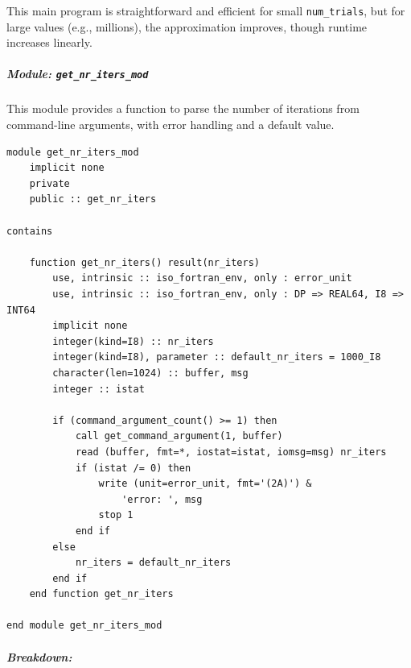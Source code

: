 This main program is straightforward and efficient for small \texttt{num\_trials}, but for large values (e.g., millions), the approximation improves, though runtime increases linearly.

\subparagraph{Module: \texttt{get\_nr\_iters\_mod}}

This module provides a function to parse the number of iterations from command-line arguments, with error handling and a default value.

\begin{verbatim}
module get_nr_iters_mod
    implicit none
    private
    public :: get_nr_iters

contains

    function get_nr_iters() result(nr_iters)
        use, intrinsic :: iso_fortran_env, only : error_unit
        use, intrinsic :: iso_fortran_env, only : DP => REAL64, I8 => INT64
        implicit none
        integer(kind=I8) :: nr_iters
        integer(kind=I8), parameter :: default_nr_iters = 1000_I8
        character(len=1024) :: buffer, msg
        integer :: istat

        if (command_argument_count() >= 1) then
            call get_command_argument(1, buffer)
            read (buffer, fmt=*, iostat=istat, iomsg=msg) nr_iters
            if (istat /= 0) then
                write (unit=error_unit, fmt='(2A)') &
                    'error: ', msg
                stop 1
            end if
        else
            nr_iters = default_nr_iters
        end if
    end function get_nr_iters

end module get_nr_iters_mod
\end{verbatim}

\subparagraph{Breakdown:}

